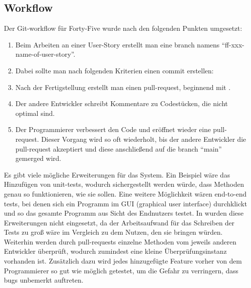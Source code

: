 \renewcommand{\kapitelautor}{Autor: Felix Zwickelstorfer}
\subsection{Workflow}\label{subsec:workflow}

Der Git-workflow für Forty-Five wurde nach den folgenden Punkten umgesetzt:
\begin{enumerate}
    \item Beim Arbeiten an einer User-Story erstellt man eine branch namens ``ff-xxx-name-of-user-story''.
    \item Dabei sollte man nach folgenden Kriterien einen commit erstellen:
    \item Nach der Fertigstellung erstellt man einen pull-request, beginnend mit \quoted{[ff-xxx]}.
    \item Der andere Entwickler schreibt Kommentare zu Codestücken, die nicht optimal sind.
    \item Der Programmierer verbessert den Code und eröffnet wieder eine pull-request.
    Dieser Vorgang wird so oft wiederholt, bis der andere Entwickler die pull-request akzeptiert und diese anschließend auf die branch ``main'' gemerged wird.
\end{enumerate}

Es gibt viele mögliche Erweiterungen für das System.
Ein Beispiel wäre das Hinzufügen von unit-tests, wodurch sichergestellt werden würde, dass Methoden genau so funktionieren, wie sie sollen.
Eine weitere Möglichkeit wären end-to-end tests, bei denen sich ein Programm im GUI (graphical user interface) durchklickt und so das gesamte Programm aus Sicht des Endnutzers testet.
In \FF wurden diese Erweiterungen nicht eingesetzt, da der Arbeitsaufwand für das Schreiben der Tests zu groß wäre im Vergleich zu dem Nutzen, den sie bringen würden.
Weiterhin werden durch pull-requests einzelne Methoden vom jeweils anderen Entwickler überprüft, wodurch zumindest eine kleine Überprüfungsinstanz vorhanden ist.
Zusätzlich dazu wird jedes hinzugefügte Feature vorher von dem Programmierer so gut wie möglich getestet, um die Gefahr zu verringern, dass bugs unbemerkt auftreten.
